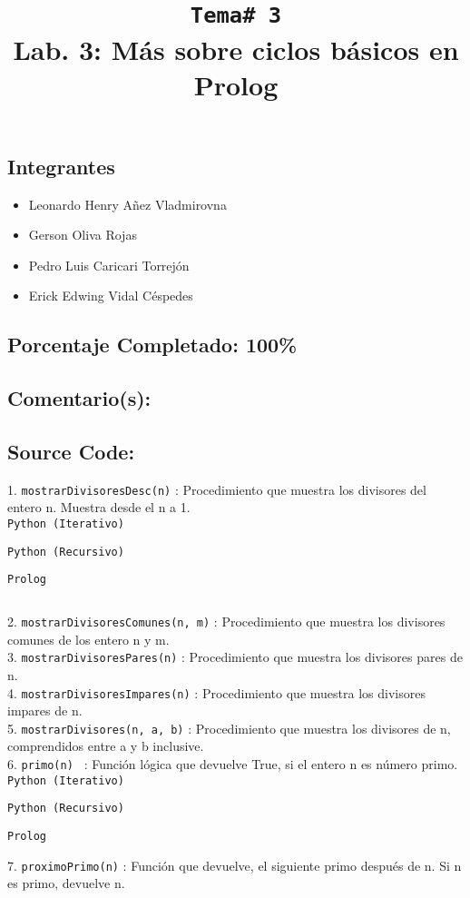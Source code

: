 \documentclass[10pt,letterpaper]{article}
\title{ \texttt{\normalsize Tema\# 3} \\ Lab. 3: Más sobre ciclos básicos en Prolog \vspace{-1cm} }
\begin{document}
\maketitle
\subsection*{Integrantes}
\begin{itemize}
\item Leonardo Henry Añez Vladmirovna
\item Gerson Oliva Rojas
\item Pedro Luis Caricari Torrejón
\item Erick Edwing Vidal Céspedes
\end{itemize}
\subsection*{Porcentaje Completado: 100\%}
\subsection*{Comentario(s):}
\subsection*{Source Code:}
1. \texttt{mostrarDivisoresDesc(n)} : Procedimiento que muestra los divisores del entero n. Muestra desde el n a 1. \\

\texttt{Python (Iterativo)}


\texttt{Python (Recursivo)}


\texttt{Prolog}

${}$\\
\pagebreak 

2. \texttt{mostrarDivisoresComunes(n, m)} : Procedimiento que muestra los divisores comunes de los entero n y m. \\

3. \texttt{mostrarDivisoresPares(n)} : Procedimiento que muestra los divisores pares de n. \\

4. \texttt{mostrarDivisoresImpares(n)} :  Procedimiento que muestra los divisores impares de n. \\

5. \texttt{mostrarDivisores(n, a, b)} :  Procedimiento que muestra los divisores de n, comprendidos entre a y b inclusive. \\

6. \texttt{primo(n) } : Función lógica que devuelve True, si el entero n es número primo. \\

\texttt{Python (Iterativo)}


\texttt{Python (Recursivo)}


\texttt{Prolog}


7. \texttt{proximoPrimo(n)} : Función que devuelve, el siguiente primo después de n. Si n es primo, devuelve n. \\
\end{document}
